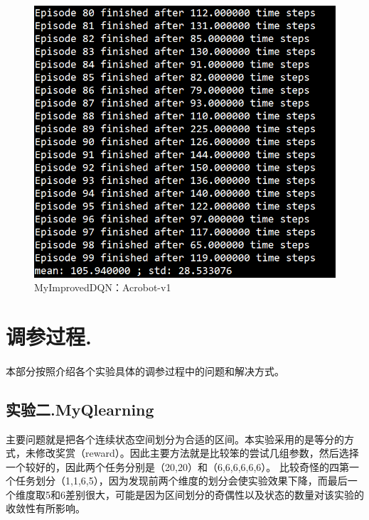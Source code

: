 \documentclass[a4paper,UTF8]{article}
\theoremstyle{definition}
\begin{document}
    \begin{center}
    \begin{figure}[H]
          \centering
          \includegraphics[width=12cm]{27.png}
          \caption{MyImprovedDQN：Acrobot-v1}
          \label{fig:2.3}
    \end{figure}
    \end{center}
    
\section{调参过程.}
    \paragraph*{}
    本部分按照介绍各个实验具体的调参过程中的问题和解决方式。	

    \subsection{实验二.MyQlearning}
    主要问题就是把各个连续状态空间划分为合适的区间。本实验采用的是等分的方式，未修改奖赏（reward）。因此主要方法就是比较笨的尝试几组参数，然后选择一个较好的，因此两个任务分别是（20,20）和（6,6,6,6,6,6）。
    比较奇怪的四第一个任务划分（1,1,6,5），因为发现前两个维度的划分会使实验效果下降，而最后一个维度取5和6差别很大，可能是因为区间划分的奇偶性以及状态的数量对该实验的收敛性有所影响。
    
\end{document}
